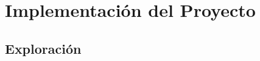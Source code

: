 \chapter{Implementación del Proyecto}
\label{chap:planificacion}


%
%
% 
%
%
% 
%
%
%
% 






\section{Exploración}
\label{sec:requerimientos}


